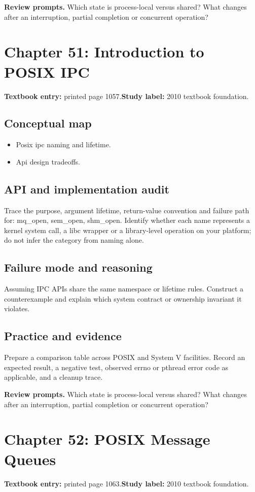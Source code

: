 \documentclass[11pt,letterpaper,oneside]{report}
\begin{document}
\textbf{Review prompts.} Which state is process-local versus shared? What changes after an interruption, partial completion or concurrent operation?

\section{Chapter 51: Introduction to POSIX IPC}
\textbf{Textbook entry:} printed page 1057.\quad \textbf{Study label:} 2010 textbook foundation.

\subsection{Conceptual map}
\begin{itemize}
\item Posix ipc naming and lifetime.
\item Api design tradeoffs.
\end{itemize}
\subsection{API and implementation audit}
Trace the purpose, argument lifetime, return-value convention and failure path for: mq\_open, sem\_open, shm\_open. Identify whether each name represents a kernel system call, a libc wrapper or a library-level operation on your platform; do not infer the category from naming alone.

\subsection{Failure mode and reasoning}
Assuming IPC APIs share the same namespace or lifetime rules. Construct a counterexample and explain which system contract or ownership invariant it violates.

\subsection{Practice and evidence}
Prepare a comparison table across POSIX and System V facilities. Record an expected result, a negative test, observed errno or pthread error code as applicable, and a cleanup trace.

\textbf{Review prompts.} Which state is process-local versus shared? What changes after an interruption, partial completion or concurrent operation?

\section{Chapter 52: POSIX Message Queues}
\textbf{Textbook entry:} printed page 1063.\quad \textbf{Study label:} 2010 textbook foundation.
\end{document}
